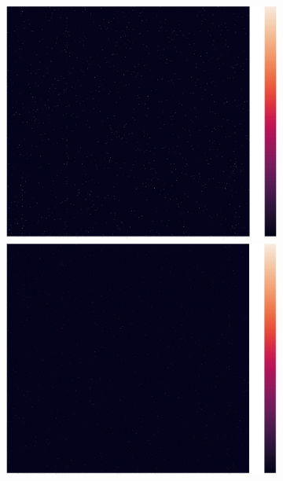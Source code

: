 \documentclass[12pt,%
               a4paper,%
               oneside,openany,%
               titlepage,%
               headinclude,footinclude,%
               BCOR5mm,%
               cleardoublepage=empty,%
               tablecaptionabove,%
               floatperchapter,
               ]{scrreprt}                 %
\begin{document}
\begin{figure}[ht]
\begin{minipage}[b]{0.5\linewidth}
\begin{figure}[ht]
\begin{minipage}[b]{0.5\linewidth}
    \centering
    \includegraphics[width=.9\linewidth]{Figures/Matrix_delta.jpg}
    \vspace{4ex}
    \begin{minipage}[b]{0.5\linewidth}
  \centering
  \includegraphics[width=.9\linewidth]{Figures/Matrix_pfizer.jpg}
  \vspace{4ex}
\end{minipage}
  \end{minipage}
    \begin{minipage}[b]{0.5\linewidth}
    \centering

\end{minipage}
\end{figure}
\end{minipage}
\end{figure}
\end{document}
